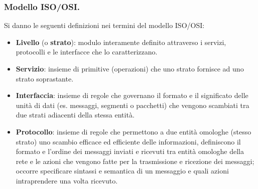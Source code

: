 \documentclass[11pt, italian, openany]{book}
\begin{document}
\begin{sloppypar}
\subsubsection*{Modello ISO/OSI.}
Si danno le seguenti definizioni nei termini del modello ISO/OSI:
\begin{itemize}[topsep=0pt]
	\itemsep-0.3em
	\item \textbf{Livello} (o \textbf{strato}): modulo interamente definito attraverso i servizi, protocolli e le interfacce che lo caratterizzano.
	\item \textbf{Servizio}: insieme di primitive (operazioni) che uno strato fornisce ad uno strato soprastante.
	\item \textbf{Interfaccia}: insieme di regole che governano il formato e il significato delle unit\`a di dati (es. messaggi, segmenti o
	pacchetti) che vengono scambiati tra due strati adiacenti della stessa entit\`a.
	\item \textbf{Protocollo}: insieme di regole che permettono a due entit\`a omologhe (stesso strato) uno scambio efficace ed efficiente delle
	informazioni, definiscono il formato e l’ordine dei messaggi inviati e ricevuti tra entit\`a omologhe della rete e le azioni che vengono
	fatte per la trasmissione e ricezione dei messaggi; occorre specificare sintassi e semantica di un messaggio e quali azioni intraprendere
	una volta ricevuto.
\end{itemize}


\end{sloppypar}
\end{document}
